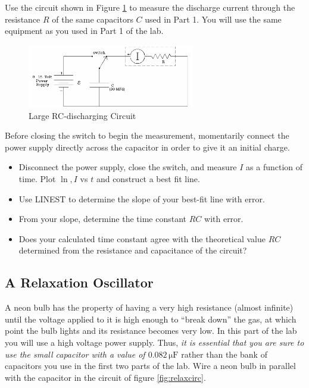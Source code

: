 Use the circuit shown in Figure \ref{fig:largercdischarge} to measure the discharge current through the resistance $R$ of the same capacitors $C$ used in Part 1. You will use the same equipment as you used in Part 1 of the lab. \myskip

\begin{figure}[h]
   \begin{center}
       \includegraphics[width=0.65\textwidth]{./Exp3/pic/image7.png}
   \end{center}
   \caption{Large RC-discharging Circuit}
   \label{fig:largercdischarge}
\end{figure}

Before closing the switch to begin the measurement, momentarily connect the power supply directly across the capacitor in order to give it an initial charge.
\begin{itemize}
  \item Disconnect the power supply, close the switch, and measure $I$ as a function of time. Plot $\ln,I$ vs $t$ and construct a best fit line.
  \item Use LINEST to determine the slope of your best-fit line with error.
  \item From your slope, determine the time constant $RC$ with error.
  \item Does your calculated time constant agree with the theoretical value $RC$ determined from the resistance and capacitance of the circuit?
\end{itemize}

\subsection{A Relaxation Oscillator}

A neon bulb has the property of having a very high resistance (almost infinite) until the voltage applied to it is high enough to ``break down'' the gas, at which point the bulb lights and its resistance becomes very low. In this part of the lab you will use a high voltage power supply. Thus, \emph{it is essential that you are sure to use the small capacitor with a value of $0.082\,\mathrm{\mu F}$} rather than the bank of capacitors you use in the first two parts of the lab. Wire a neon bulb in parallel with the capacitor in the circuit of figure \ref{fig:relaxcirc}.\myskip

